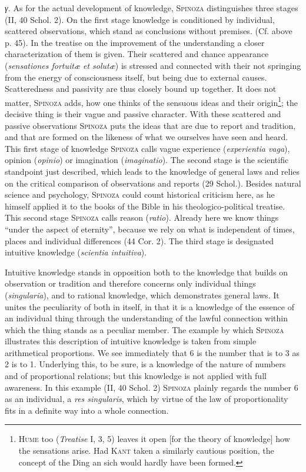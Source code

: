 \documentclass[12pt]{article}
\newcommand{\opage}[1]{\marginnote{\footnotesize\textit{[#1]}}}
\begin{document}
\textit{γ.} As for the actual development of knowledge, \textsc{Spinoza} distinguishes
three stages (II, 40 Schol. 2). On the first stage knowledge is conditioned by individual,
scattered observations, which stand as conclusions without premises. (Cf. above p. 45).
\opage{51}In the treatise on the improvement of the understanding a closer characterization
of them is given. Their scattered and chance appearance (\textit{sensationes fortuitæ et
solutæ}) is stressed and connected with their not springing from the energy of
consciousness itself, but being due to external causes. Scatteredness and passivity are thus
closely bound up together. It does not matter, \textsc{Spinoza} adds, how one thinks of the
sensuous ideas and their origin\footnote{\textsc{Hume} too (\textit{Treatise} I, 3, 5)
leaves it open [for the theory of knowledge] how the sensations arise. Had \textsc{Kant}
taken a similarly cautious position, the concept of the Ding an sich would hardly have been
formed.}; the decisive thing is their vague and passive character. With these scattered and
passive observations \textsc{Spinoza} puts the ideas that are due to report and tradition,
and that are formed on the likeness of what we ourselves have seen and heard. This first
stage of knowledge \textsc{Spinoza} calls vague experience (\textit{experientia vaga}),
opinion (\textit{opinio}) or imagination (\textit{imaginatio}). %
The second stage is the scientific standpoint just described, which leads to the knowledge
of general laws and relies on the critical comparison of observations and reports (29
Schol.). Besides natural science and psychology, \textsc{Spinoza} could count historical
criticism here, as he himself applied it to the books of the Bible in his
theologico-political treatise. This second stage \textsc{Spinoza} calls reason
(\textit{ratio}). Already here we know things ``under the aspect of eternity'', because we
rely on what is independent of times, places and individual differences (44 Cor. 2). The
third stage is designated intuitive knowledge (\textit{scientia intuitiva}).

Intuitive knowledge stands in opposition both to the knowledge that builds on observation
or tradition and therefore concerns only individual things (\textit{singularia}), and to
rational knowledge, which demonstrates general laws. It unites the peculiarity of both in
itself, in that it is a knowledge of the essence of an individual thing through the
understanding of the lawful connection within which the thing stands as a peculiar member.
The example by which \textsc{Spinoza} illustrates this description of intuitive knowledge is
taken from simple arithmetical proportions. We see immediately that 6 is the number that is
to 3 as 2 is to 1. Underlying this, to be sure, is a knowledge of the nature of numbers and
of proportional relations; but this knowledge is not applied with full awareness. In this
example (II, 40 Schol. 2) \textsc{Spinoza} plainly regards the number 6 as an individual, a
\textit{res singularis}, which by virtue of the law of proportionality fits in a definite way
into a whole connection.
\end{document}
